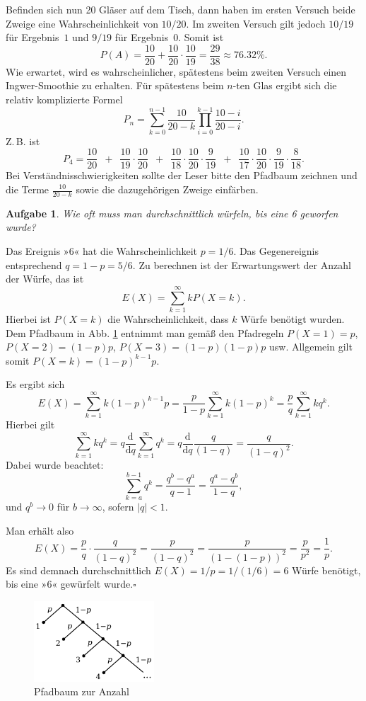 \documentclass[a4paper,10pt,fleqn,twoside]{scrartcl}
\numberwithin{equation}{section}
\newcommand{\strong}[1]{{\normalfont\sffamily\bfseries #1}}
\renewcommand{\qedsymbol}{\ensuremath{\square}}
\theoremstyle{Aufgabe}
\newtheorem{Aufgabe}{\sffamily Aufgabe}[section]
\begin{document}
Befinden sich nun 20 Gläser auf dem Tisch, dann haben im ersten
Versuch beide Zweige eine Wahrscheinlichkeit von $10/20$. Im
zweiten Versuch gilt jedoch $10/19$ für Ergebnis~$1$ und $9/19$ für
Ergebnis~$0$. Somit ist
\[P(A) = \frac{10}{20}+\frac{10}{20}\cdot\frac{10}{19}
= \frac{29}{38} \approx 76.32\%.\]
Wie erwartet, wird es wahrscheinlicher, spätestens beim zweiten
Versuch einen Ingwer-Smoothie zu erhalten. Für spätestens beim $n$-ten
Glas ergibt sich die relativ komplizierte Formel
\[P_n = \sum_{k=0}^{n-1} \frac{10}{20-k}\prod_{i=0}^{k-1} \frac{10-i}{20-i}.\]
Z.\,B. ist
\[P_4 = \frac{10}{20}\enspace +\enspace\frac{10}{19}\cdot \frac{10}{20}
\enspace +\enspace\frac{10}{18}\cdot\frac{10}{20}\cdot\frac{9}{19}
\enspace +\enspace\frac{10}{17}\cdot\frac{10}{20}\cdot\frac{9}{19}\cdot\frac{8}{18}.\]
Bei Verständnisschwierigkeiten sollte der Leser bitte den Pfadbaum
zeichnen und die Terme $\frac{10}{20-k}$ sowie die dazugehörigen
Zweige einfärben.

\begin{Aufgabe}
Wie oft muss man durchschnittlich würfeln, bis eine 6 geworfen wurde?
\end{Aufgabe}

\noindent\strong{Lösung.}
Das Ereignis »6« hat die Wahrscheinlichkeit $p=1/6$. Das
Gegenereignis entsprechend $q=1-p=5/6$. Zu berechnen ist der
Erwartungswert der Anzahl der Würfe, das ist
\[E(X) = \sum_{k=1}^\infty kP(X=k).\]
Hierbei ist $P(X=k)$ die Wahrscheinlichkeit, dass $k$ Würfe
benötigt wurden. Dem Pfadbaum in Abb. \ref{fig:Pfadbaum-zur-Anzahl} entnimmt
man gemäß den Pfadregeln $P(X=1)=p$, $P(X=2)=(1-p)p$,
$P(X=3)=(1-p)(1-p)p$ usw. Allgemein gilt somit $P(X=k)=(1-p)^{k-1}p$.

Es ergibt sich
\[E(X) = \sum_{k=1}^\infty k(1-p)^{k-1}p
= \frac{p}{1-p}\sum_{k=1}^\infty k(1-p)^k
= \frac{p}{q}\sum_{k=1}^\infty kq^k.\]
Hierbei gilt
\[\sum_{k=1}^\infty kq^k = q\frac{\mathrm d}{\mathrm dq}
\sum_{k=1}^\infty q^k = q\frac{\mathrm d}{\mathrm dq}\frac{q}{(1-q)}
= \frac{q}{(1-q)^2}.\]
Dabei wurde beachtet:
\[\sum_{k=a}^{b-1}q^k = \frac{q^b-q^a}{q-1}
= \frac{q^a-q^b}{1-q},\]
und $q^b\to 0$ für $b\to\infty$, sofern $|q|<1$.

Man erhält also
\[E(X) = \frac{p}{q}\cdot \frac{q}{(1-q)^2} = \frac{p}{(1-q)^2}
= \frac{p}{(1-(1-p))^2} = \frac{p}{p^2} = \frac{1}{p}.\]
Es sind demnach durchschnittlich $E(X)=1/p=1/(1/6)=6$ Würfe
benötigt, bis eine »6« gewürfelt wurde.\;\qedsymbol

\begin{figure}[t]
\begin{center}
\includegraphics[width=0.4\textwidth]{img/Pfadbaum-zur-Anzahl.pdf}
\end{center}
\caption{Pfadbaum zur Anzahl}
\label{fig:Pfadbaum-zur-Anzahl}
\end{figure}
\end{document}
